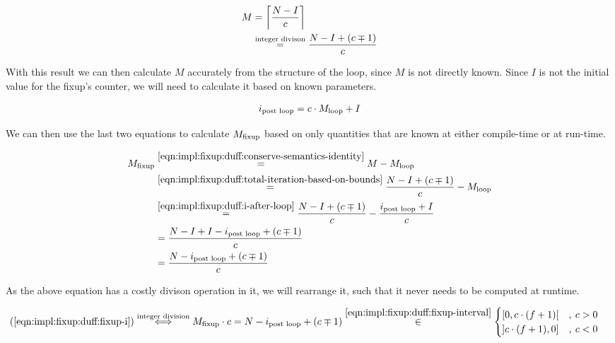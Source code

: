 \begin{equation}\label{eqn:impl:fixup:duff:total-iteration-based-on-bounds}
\begin{aligned}
    M &= \left\lceil{}\frac{N - I}{c}\right\rceil{} \\
    & \overset{\text{integer divison}}{=} \frac{N - I + (c \mp 1)}{c}
\end{aligned}
\end{equation}

With this result we can then calculate $M$ accurately from the structure of the loop, since $M$ is not directly known.
Since $I$ is not the initial value for the fixup's counter, we will need to calculate it based on known parameters.

\begin{equation}\label{eqn:impl:fixup:duff:i-after-loop}
\begin{aligned}
    i_\text{post loop} = c \cdot M_{\text{loop}} + I
\end{aligned}
\end{equation}

We can then use the last two equations to calculate $M_{\text{fixup}}$ based on only quantities that are known at either compile-time or at run-time.

\begin{equation}\label{eqn:impl:fixup:duff:fixup-i}
\begin{aligned}
    M_{\text{fixup}} & \overset{\ref{eqn:impl:fixup:duff:conserve-semantics-identity}}{=} M - M_{\text{loop}} \\
    & \overset{\ref{eqn:impl:fixup:duff:total-iteration-based-on-bounds}}{=}
    \frac{N - I + (c \mp 1)}{c} - M_{\text{loop}} \\
    & \overset{\ref{eqn:impl:fixup:duff:i-after-loop}}{=}
    \frac{N - I + (c \mp 1)}{c} - \frac{i_\text{post loop} + I}{c} \\
    &= \frac{N - I + I - i_\text{post loop} + (c \mp 1)}{c}\\
    &= \frac{N - i_\text{post loop} + (c \mp 1)}{c}
\end{aligned}
\end{equation}

As the above equation has a costly divison operation in it, we will rearrange it, such that it never needs to be computed at runtime.

\begin{equation}\label{eqn:impl:fixup:duff:fixup-i-mult}
\begin{aligned}
    (\ref{eqn:impl:fixup:duff:fixup-i}) &\overset{\text{integer division}}{\Longleftrightarrow} M_{\text{fixup}} \cdot c = N - i_\text{post loop} + (c \mp 1) \overset{\ref{eqn:impl:fixup:duff:fixup-interval}}{\in}  \begin{cases} \lbrack 0, c \cdot (f + 1) \lbrack &, \medspace c > 0\\ \rbrack c \cdot (f + 1), 0 \rbrack &, \medspace c < 0 \end{cases} 
\end{aligned}
\end{equation}

